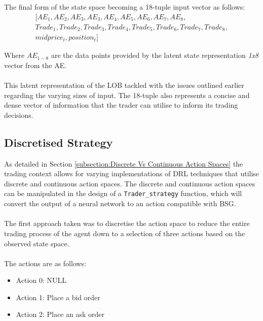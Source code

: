 \documentclass[ %
                    author={Ashwinder Khurana},
                supervisor={Prof Dave Cliff},
                    degree={MEng},
                     title={The Deeply Reinforced Trader},
                  subtitle={},
                      type={enterprise},
                      year={2020} ]{dissertation}
\begin{document}
{\\
\\
The final form of the state space becoming a 18-tuple input vector as follows:
\begin{equation}
\label{Final state}
\begin{split}
[AE_1,AE_2,AE_3,AE_3,AE_4,AE_5, AE_6, AE_7, AE_8, \\Trade_1,Trade_2, Trade_3, Trade_4, Trade_5, Trade_6, Trade_7, Trade_8,\\ midprice_t, position_t]  
\end{split}
\end{equation}

\noindent
Where $AE_{1-8}$ are the data points provided by the latent state representation \textit{1x8} vector from the AE. 
\\
\\
\noindent
This latent representation of the LOB tackled with the issues outlined earlier regarding the varying sizes of input. The 18-tuple also represents a concise and dense vector of information that the trader can utilise to inform its trading decisions. 


\subsection{Discretised Strategy}
\label{subsection:Discretised Strategy}
As detailed in Section \ref{subsection:Discrete Vs Continuous Action Spaces} the trading context allows for varying implementations of DRL techniques that utilise discrete and continuous action spaces. The discrete and continuous action spaces can be manipulated in the design of a \texttt{Trader\_strategy} function, which will convert the output of a neural network to an action compatible with BSG. 
\\
\\
The first approach taken was to discretise the action space to reduce the entire trading process of the agent down to a selection of three actions based on the observed state space.
\\
\\
The actions are as follows: 
\begin{itemize}
\item Action 0: NULL 
\item Action 1: Place a bid order
\item Action 2: Place an ask order
\end{itemize}

}
\end{document}
